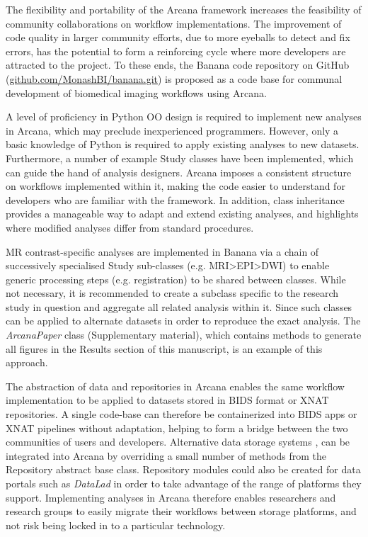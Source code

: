 \documentclass[smallextended]{svjour3}       %
\begin{document}
The flexibility and portability of the Arcana framework increases the
feasibility of community collaborations on workflow implementations. The
improvement of code quality in larger community efforts, due to more
eyeballs to detect and fix errors, has the potential to form a
reinforcing cycle where more developers are attracted to the project.
To these ends, the Banana code repository on GitHub
(\url{github.com/MonashBI/banana.git}) is proposed as a code base
for communal development of biomedical imaging workflows using Arcana.

A level of proficiency in Python OO design is required to implement new
analyses in Arcana, which may preclude inexperienced programmers.
However, only a basic knowledge of Python is required to apply existing
analyses to new datasets. Furthermore, a number of example Study classes
have been implemented, which can guide the hand of analysis designers.
Arcana imposes a consistent structure on workflows implemented within
it, making the code easier to understand for developers who are familiar
with the framework. In addition, class inheritance provides a manageable
way to adapt and extend existing analyses, and highlights where
modified analyses differ from standard procedures.

MR contrast-specific analyses are implemented in Banana via a chain
of successively specialised Study sub-classes (e.g.
MRI\textgreater{}EPI\textgreater{}DWI) to enable generic processing
steps (e.g. registration) to be shared between classes. While not
necessary, it is recommended to create a subclass specific to the
research study in question and aggregate all related analysis within it.
Since such classes can be applied to alternate datasets in order to
reproduce the exact analysis. The \emph{ArcanaPaper} class
(Supplementary material), which contains methods to generate all figures
in the Results section of this manuscript, is an example of this approach.

The abstraction of data and repositories in Arcana enables the same
workflow implementation to be applied to datasets stored in BIDS format
or XNAT repositories. A single code-base can therefore be containerized
into BIDS apps or XNAT pipelines without adaptation, helping to form a
bridge between the two communities of users and developers. Alternative
data storage systems \citep{scott_coins:_2011,das_loris:_2012,book_neuroinformatics_2013},
can be integrated into Arcana by overriding a small number of
methods from the Repository abstract base class. Repository modules
could also be created for data portals such as \emph{DataLad}
\citep{yaroslav_halchenko_datalad/datalad_2018}
in order to take advantage of the range of platforms they support.
Implementing analyses in Arcana therefore enables researchers and
research groups to easily migrate their workflows between storage
platforms, and not risk being locked in to a particular technology.
\end{document}
